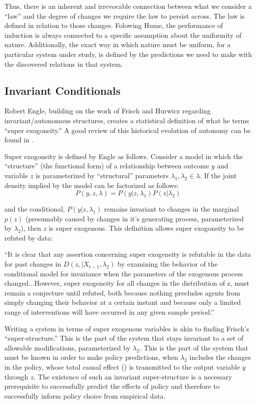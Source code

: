 \documentclass[a4paper,12pt]{article}
\begin{document}
Thus, there is an inherent and irrevocable connection between what we consider a ``law'' and the degree of changes we require the law to persist across. The law is defined in relation to those changes. Folowing Hume, the performance of induction is always connected to a specific assumption about the uniformity of nature. Additionally, the exact way in which nature must be uniform, for a particular system under study, is defined by the predictions we need to make with the discovered relations in that system.


\subsection{Invariant Conditionals}

Robert Engle, building on the work of Frisch and Hurwicz regarding invariant/autonomous structures, creates a statistical definition of what he terms ``super exogoneity.'' A good review of this historical evolution of autonomy can be found in \cite{Aldrich1989}.

Super exogoneity is defined by Engle as follows. Consider a model in which the ``structure'' (the functional form) of a relationship between outcome $y$ and variable $z$ is parameterized by ``structural'' parameters $\lambda_1, \lambda_2 \in \lambda$. If the joint density implied by the model can be factorized as follows:
%
$$
P(y, z, \lambda) = P(y | z, \lambda_1)P(z | \lambda_2)
$$

and the conditional, $P(y | z, \lambda_1)$ remains invariant to changes in the marginal $p(z)$ (presumably caused by changes in it's generating process, parameterized by $\lambda_2$), then $z$ is super exogenous. This definition allows super exogoneity to be refuted by data:

\begin{displayquote}
``It is clear that any assertion concerning super exogeneity is refutable in the data for past changes in $D(z, | X_{t-1}, \lambda_2)$ by examining the behavior of the conditional model for invariance when the parameters of the exogenous process changed...However, super exogeneity for all changes in the distribution of z, must remain a conjecture until refuted, both because nothing precludes agents from simply changing their behavior at a certain instant and because only a limited range of interventions will have occurred in any given sample period.''
\end{displayquote}

Writing a system in terms of super exogenous variables is akin to finding Frisch's ``super-structure.'' This is the part of the system that stays invariant to a set of allowable modifications, parameterized by $\lambda_2$. This is the part of the system that must be known in order to make policy predictions, when $\lambda_2$ includes the changes in the policy, whose total causal effect (\cite[in the sense of][]{Pearl2000}) is transmitted to the output variable $y$ through $z$. The existence of such an invariant super-structure is a necessary prerequisite to successfully predict the effects of policy and therefore to successfully inform policy choice from empirical data.
\end{document}
